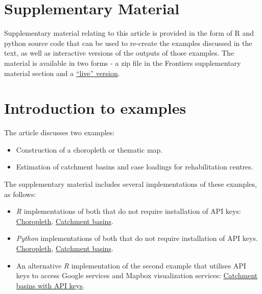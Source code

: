 \documentclass[utf8]{frontiers_suppmat} %
\begin{document}
\onecolumn
{}

\title[Supplementary Material]{{}}


\maketitle


\section{Supplementary Material}

Supplementary material relating to this article is provided in the
form of R and python source code that can be used to re-create the
examples discussed in the text, as well as interactive versions of the
outputs of those examples. The material is available in two forms - a
zip file in the Frontiers supplementary material section and a
\href{https://SymbolixAu.github.io/Geospatial/index.html}{``live''
  version}.

\section{Introduction to examples}

The article discusses two examples: 
\begin{itemize}
\item Construction of a choropleth or thematic map.
\item Estimation of catchment basins and case loadings for rehabilitation centres.
\end{itemize}

The supplementary material includes several implementations of these examples, as follows:

\begin{itemize}
\item {\em R} implementations of both that do not require installation of API keys: \href{https://symbolixAU.github.io/GeospatialStroke/Choropleth/mmc_surrounds.html}{Choropleth}, \href{https://symbolixAU.github.io/GeospatialStroke/RehabCatchment/README.html}{Catchment basins}.
\item {\em Python} implementations of both that do not require installation of API keys. \href{https://symbolixAU.github.io/GeospatialStroke/python/notebooks/example1.html}{Choropleth}, \href{https://symbolixAU.github.io/GeospatialStroke/python/notebooks/example2.html}{Catchment basins}.
\item An alternative {\em R} implementation of the second example that utilises API keys to access Google services and Mapbox visualization services: \href{https://symbolixAU.github.io/GeospatialStroke/RehabCatchmentAdvances/Googleway_Mapdeck.html}{Catchment basins with API keys}.
\end{itemize}
\end{document}
